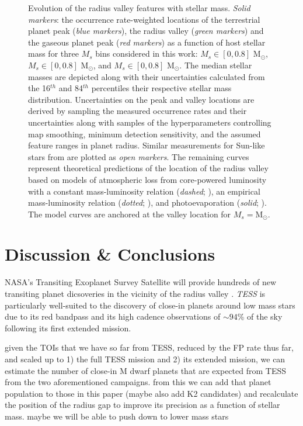 \documentclass[twocolumn]{emulateapj}
\newcommand{\tess}[1]{\emph{TESS}#1}
\begin{document}


\begin{figure*}
  \centering
  \caption{Evolution of the radius valley features with stellar mass. \emph{Solid markers}:
    the occurrence rate-weighted locations of the terrestrial planet peak (\emph{blue markers}), the
    radius valley (\emph{green markers}) and the gaseous planet peak (\emph{red markers})
    as a function of host stellar mass for three $M_s$ bins considered in
    this work: $M_s \in [0,0.8]$ M$_{\odot}$, $M_s \in [0,0.8]$ M$_{\odot}$, and $M_s \in [0,0.8]$ M$_{\odot}$. The median stellar masses
    are depicted along with their uncertainties calculated from the 16$^{th}$ and 84$^{th}$ percentiles their respective stellar
    mass distribution. Uncertainties on the
    peak and valley locations are derived by sampling the measured occurrence rates and their uncertainties along
    with samples of the hyperparameters controlling map smoothing, minimum detection sensitivity, and the assumed feature ranges in
    planet radius. Similar measurements for Sun-like stars from \cite{fulton18} are plotted as \emph{open markers}. The remaining
    curves represent theoretical predictions of the location of the radius valley based on models of atmospheric loss from
    core-powered luminosity with a constant mass-luminosity relation (\emph{dashed}; \citealt{gupta19b}), an empirical mass-luminosity
    relation (\emph{dotted}; \citealt{gupta19b}), and photoevaporation (\emph{solid}; \citealt{wu19}).
    The model curves are anchored at the valley location for $M_s = \text{M}_{\odot}$.}
  \label{fig:rpvMs}
\end{figure*}




\section{Discussion \& Conclusions} \label{sect:conclusion}
NASA's Transiting Exoplanet Survey Satellite \citep[\tess{;}][]{ricker15} will provide hundreds of new transiting planet
dicsoveries in the vicinity of the radius valley \citep{barclay18}. \tess{} is particularly well-suited to the discovery of
close-in planets around low mass stars due to its red bandpass and its high cadence observations of $\sim 94$\% of the sky
following its first extended mission. 


given the TOIs that we have so far from TESS, reduced by the FP rate thus far, and scaled up to 1) the full TESS mission and 2) its extended mission, 
we can estimate the number of close-in M dwarf planets that are expected from TESS from the two aforementioned campaigns. from this we can add that 
planet population to those in this paper (maybe also add K2 candidates) and recalculate the position of the radius gap to improve its precision as 
a function of stellar mass. maybe we will be able to push down to lower mass stars
\end{document}
